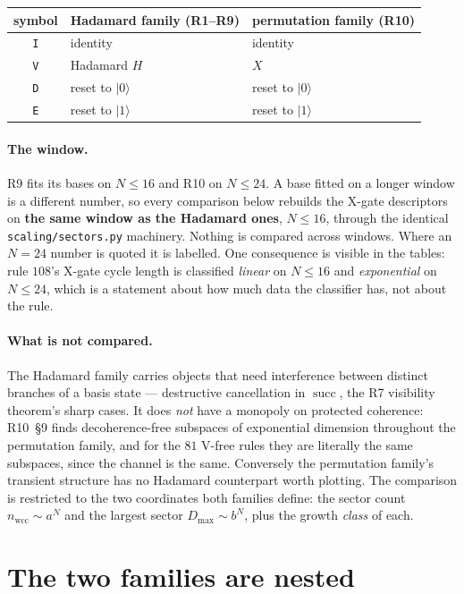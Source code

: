 \documentclass[11pt]{article}
\newcommand{\rt}[1]{\texttt{#1}}
\newcommand{\fn}[1]{\texttt{#1}}
\providecommand{\ket}[1]{|#1\rangle}
\newcommand{\wcc}{\mathrm{wcc}}
\theoremstyle{plain}
\theoremstyle{remark}
\begin{document}
\begin{center}
\begin{tabular}{cll}
\toprule
symbol & Hadamard family (R1--R9) & permutation family (R10) \\
\midrule
\rt{I} & identity & identity \\
\rt{V} & Hadamard $H$ & $X$ \\
\rt{D} & reset to $\ket0$ & reset to $\ket0$ \\
\rt{E} & reset to $\ket1$ & reset to $\ket1$ \\
\bottomrule
\end{tabular}
\end{center}

\paragraph{The window.} R9 fits its bases on $N\le16$ and R10 on $N\le24$. A base
fitted on a longer window is a different number, so every comparison below
rebuilds the X-gate descriptors on \textbf{the same window as the Hadamard ones},
$N\le16$, through the identical \fn{scaling/sectors.py} machinery. Nothing is
compared across windows. Where an $N=24$ number is quoted it is labelled. One
consequence is visible in the tables: rule $108$'s X-gate cycle length is
classified \emph{linear} on $N\le16$ and \emph{exponential} on $N\le24$, which is
a statement about how much data the classifier has, not about the rule.

\paragraph{What is not compared.} The Hadamard family carries objects that need
interference between distinct branches of a basis state --- destructive
cancellation in $\operatorname{succ}$, the R7 visibility theorem's sharp cases.
It does \emph{not} have a monopoly on protected coherence: R10~\S9 finds
decoherence-free subspaces of exponential dimension throughout the permutation
family, and for the $81$ V-free rules they are literally the same subspaces,
since the channel is the same. Conversely the
permutation family's transient structure has no Hadamard counterpart worth
plotting. The comparison is restricted to the two coordinates both families
define: the sector count $n_\wcc\sim a^N$ and the largest sector
$D_{\max}\sim b^N$, plus the growth \emph{class} of each.

\section{The two families are nested}
\label{sec:refine}
\end{document}
